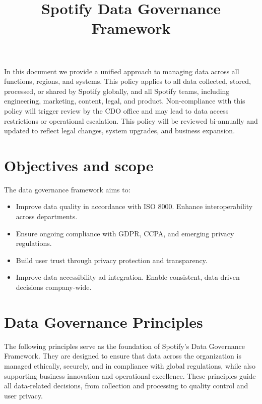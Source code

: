 \documentclass[11pt,a4paper,computermodern]{article}
\title{Spotify Data Governance Framework}
\date{}
\begin{document}
\maketitle

\vspace{-10mm}


In this document we provide a unified approach to managing data across all functions, regions, and systems. This policy applies to all data collected, stored, processed, or shared by Spotify globally, and all Spotify teams, including engineering, marketing, content, legal, and product. Non-compliance with this policy will trigger review by the CDO office and may lead to data access restrictions or operational escalation. This policy will be reviewed bi-annually and updated to reflect legal changes, system upgrades, and business expansion.

\section*{Objectives and scope}

The data governance framework aims to:
\begin{itemize}[itemsep=5pt, parsep=0pt]
	\item Improve data quality in accordance with ISO 8000. Enhance interoperability across departments.
	\item Ensure ongoing compliance with GDPR, CCPA, and emerging privacy regulations.
	\item Build user trust through privacy protection and transparency.
	\item Improve data accessibility ad integration. Enable consistent, data-driven decisions company-wide.
\end{itemize}


\section*{Data Governance Principles}

The following principles serve as the foundation of Spotify’s Data Governance Framework. They are designed to ensure that data across the organization is managed ethically, securely, and in compliance with global regulations, while also supporting business innovation and operational excellence. These principles guide all data-related decisions, from collection and processing to quality control and user privacy.
\end{document}
